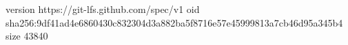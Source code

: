 version https://git-lfs.github.com/spec/v1
oid sha256:9df41ad4e6860430c832304d3a882ba5f8716e57e45999813a7cb46d95a345b4
size 43840
